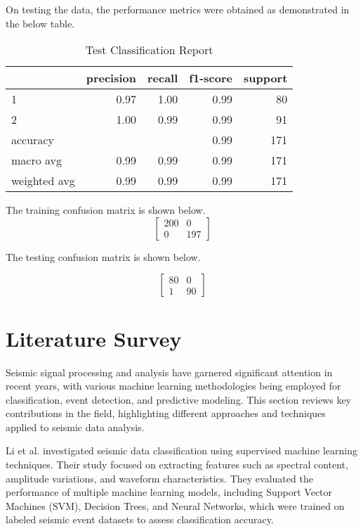 \documentclass[conference]{IEEEtran}
\begin{document}
On testing the data, the performance metrics were obtained as demonstrated in the below table.

\begin{table}[htbp]
\caption{Test Classification Report}
\centering
\begin{tabular}{lrrrr}
 & precision & recall & f1-score & support\\
\hline
1 & 0.97 & 1.00 & 0.99 & 80\\
2 & 1.00 & 0.99 & 0.99 & 91\\
accuracy &  &  & 0.99 & 171\\
macro avg & 0.99 & 0.99 & 0.99 & 171\\
weighted avg & 0.99 & 0.99 & 0.99 & 171\\
\end{tabular}
\end{table}

The training confusion matrix is shown below.
\begin{equation}
\begin{bmatrix}
200 & 0 \\
0 & 197
\end{bmatrix}
\end{equation}


The testing confusion matrix is shown below.

\begin{equation}
\begin{bmatrix}
80 & 0 \\
1 & 90
\end{bmatrix}
\end{equation}
\section{Literature Survey}
\label{sec:org5aae6e6}
Seismic signal processing and analysis have garnered significant attention in
recent years, with various machine learning methodologies being employed for
classification, event detection, and predictive modeling. This section reviews
key contributions in the field, highlighting different approaches and techniques
applied to seismic data analysis.


Li et al. \cite{b1} investigated seismic data
classification using supervised machine learning techniques. Their study focused
on extracting features such as spectral content, amplitude variations, and
waveform characteristics. They evaluated the performance of multiple machine
learning models, including Support Vector Machines (SVM), Decision Trees, and
Neural Networks, which were trained on labeled seismic event datasets to assess
classification accuracy.
\end{document}
